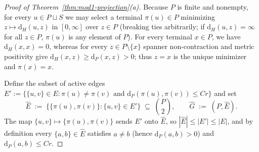 \documentclass[11pt]{article}
\theoremstyle{definition}
\theoremstyle{remark}
\newcommand{\dH}{\mathrm{d}_H}
\newcommand{\dP}{\mathrm{d}_P}
\begin{document}
\begin{proof}[Proof of Theorem~\ref{thm:mod1-projection}(a)]
Because $P$ is finite and nonempty, for every $u \in P \sqcup S$ we may select a terminal $\pi(u) \in P$ minimizing $z \mapsto \dH(u, z)$ in $[0, \infty]$ over $z \in P$ (breaking ties arbitrarily; if $\dH(u, z) = \infty$ for all $z \in P$, $\pi(u)$ is any element of $P$). For every terminal $x \in P$, we have $\dH(x, x) = 0$, whereas for every $z \in P \setminus \{x\}$ spanner non-contraction and metric positivity give $\dH(x, z) \ge \dP(x, z) > 0$; thus $z = x$ is the unique minimizer and $\pi(x) = x$.

Define the subset of active edges $E' := \bigl\{\{u, v\} \in E : \pi(u) \ne \pi(v) \text{ and } \dP(\pi(u), \pi(v)) \le C r\bigr\}$ and set
\[
\widehat{E} \;:=\; \bigl\{\{\pi(u), \pi(v)\} : \{u, v\} \in E'\bigr\} \;\subseteq\; \binom{P}{2}, \qquad \widehat{G} \;:=\; (P, \widehat{E}).
\]
The map $\{u, v\} \mapsto \{\pi(u), \pi(v)\}$ sends $E'$ onto $\widehat{E}$, so $|\widehat{E}| \le |E'| \le |E|$, and by definition every $\{a, b\} \in \widehat{E}$ satisfies $a \ne b$ (hence $\dP(a, b) > 0$) and $\dP(a, b) \le C r$.


\end{proof}
\end{document}
